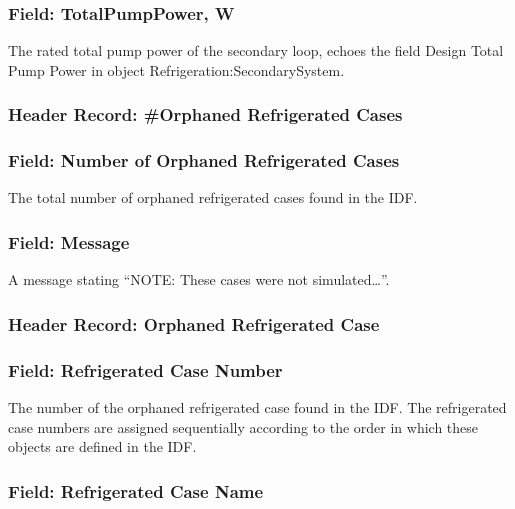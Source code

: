 \subsubsection{Field: TotalPumpPower, W}\label{field-totalpumppower-w-1}

The rated total pump power of the secondary loop, echoes the field Design Total Pump Power in object Refrigeration:SecondarySystem.

\subsubsection{Header Record: \#Orphaned Refrigerated Cases}\label{header-record-orphaned-refrigerated-cases}

\subsubsection{Field: Number of Orphaned Refrigerated Cases}\label{field-number-of-orphaned-refrigerated-cases}

The total number of orphaned refrigerated cases found in the IDF.

\subsubsection{Field: Message}\label{field-message}

A message stating ``NOTE: These cases were not simulated\ldots{}''.

\subsubsection{Header Record: Orphaned Refrigerated Case}\label{header-record-orphaned-refrigerated-case}

\subsubsection{Field: Refrigerated Case Number}\label{field-refrigerated-case-number}

The number of the orphaned refrigerated case found in the IDF. The refrigerated case numbers are assigned sequentially according to the order in which these objects are defined in the IDF.

\subsubsection{Field: Refrigerated Case Name}\label{field-refrigerated-case-name}


